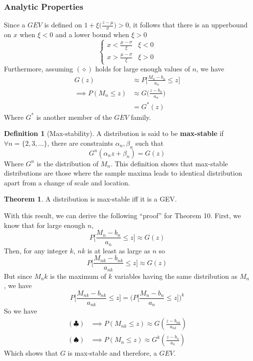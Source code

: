 \documentclass{article}
\theoremstyle{definition}
\newtheorem{theorem}{Theorem}
\theoremstyle{definition}
\newtheorem{definition}{Definition}
\begin{document}
\subsubsection{Analytic Properties}
Since a $GEV$ is defined on $1+\xi \bigg(\frac{z-\mu}{\sigma}\bigg)>0$, it follows that there is an upperbound on $x$ when $\xi<0$ and a lower bound when $\xi>0$
\[\begin{cases}
x < \frac{\mu-\sigma}{\xi}& \xi<0\\
x > \frac{\mu-\sigma}{\xi}& \xi>0
\end{cases}\]
Furthermore, assuming $(\diamond)$ holds for large enough values of $n$, we have 
\begin{align*}
    G(z)&\approx P \bigg[\frac{M_n-b_n}{a_n}\leq z \bigg]\\
    \implies P(M_n\leq z)& \approx G\bigg(\frac{z-b_n}{a_n}\bigg)\\
    &=G^*(z)
\end{align*}
Where $G^*$ is another member of the $GEV$ family.
\begin{definition}[Max-stability] A distribution is said to be \textbf{max-stable} if $\forall n=\{2,3,\hdots\}$, there are constraints $\alpha_n,\beta_n$ such that 
\[G^n(\alpha_nz+\beta_n)=G(z)\]
Where $G^n$ is the distribution of $M_n$. This definition shows that max-stable distributions are those where the sample maxima leads to identical distribution apart from a change of scale and location. 

\end{definition}
\begin{theorem}
A distribution is max-stable iff it is a GEV.
\end{theorem}
\noindent With this result, we can derive the following ``proof'' for Theorem 10. First, we know that for large enough $n$,
\[P\bigg[\frac{M_n-b_n}{a_n}\leq z \bigg]  \approx G(z)\]
Then, for any integer $k$, $nk$ is at least as large as $n$ so
\[P\bigg[\frac{M_{nk}-b_{nk}}{a_{nk}}\leq z \bigg]  \approx G(z) \tag{$\clubsuit$}\]
But since $M_nk$ is the maximum of $k$ variables having the same distribution as $M_n$, we have
\[P\bigg[\frac{M_{nk}-b_{nk}}{a_{nk}}\leq z \bigg] =\bigg( P\bigg[\frac{M_n-b_n}{a_n}\leq z \bigg]\bigg)^k \tag{$\spadesuit$}\]
So we have
\begin{align*}
    (\clubsuit)&\implies P(M_{nk}\leq z)\approx G(\frac{z-b_{nk}}{a_{nk}})\\
    (\spadesuit)&\implies P(M_{n}\leq z)\approx G^k(\frac{z-b_n}{a_n})
\end{align*}
Which shows that $G$ is max-stable and therefore, a $GEV$.
\end{document}
